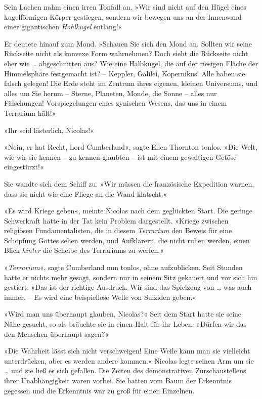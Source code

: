 Sein Lachen nahm einen irren Tonfall an. »Wir sind nicht auf den
Hügel eines kugelförmigen Körper gestiegen, sondern wir bewegen uns
an der Innenwand einer gigantischen \emph{Hohlkugel} entlang!«

Er deutete hinauf zum Mond. »Schauen Sie sich den Mond an. Sollten
wir seine Rückseite nicht als konvexe Form wahrnehmen? Doch sieht
die Rückseite nicht eher wie … abgeschnitten aus? Wie eine
Halbkugel, die auf der riesigen Fläche der Himmelsphäre festgemacht
ist? – Keppler, Galilei, Kopernikus! Alle haben sie falsch gelegen!
Die Erde steht im Zentrum ihres eigenen, kleinen Universums, und
alles um Sie herum – Sterne, Planeten, Monde, die Sonne – alles nur
Fälschungen! Vorspiegelungen eines zynischen Wesens, das uns in
einem Terrarium hält!«

»Ihr seid lästerlich, Nicolas!«

»Nein, er hat Recht, Lord Cumberland«, sagte Ellen Thornton tonlos.
»Die Welt, wie wir sie kennen – zu kennen glaubten – ist mit einem
gewaltigen Getöse eingestürzt!«

Sie wandte sich dem Schiff zu. »Wir müssen die französische
Expedition warnen, dass sie nicht wie eine Fliege an die Wand
klatscht.«

\tb

»Es wird Kriege geben«, meinte Nicolas nach dem geglückten Start.
Die geringe Schwerkraft hatte in der Tat kein Problem dargestellt.
»Kriege zwischen religiösen Fundamentalisten, die in diesem
\emph{Terrarium} den Beweis für eine Schöpfung Gottes sehen werden,
und Aufklärern, die nicht ruhen werden, einen Blick \emph{hinter}
die Scheibe des Terrariums zu werfen.«

\bigpar

»\emph{Terrarium}«, sagte Cumberland nun tonlos, ohne aufzublicken.
Seit Stunden hatte er nichts mehr gesagt, sondern nur in seinem
Sitz gekauert und vor sich hin gestiert. »Das ist der richtige
Ausdruck. Wir sind das Spielzeug von … was auch immer. – Es wird
eine beispiellose Welle von Suiziden geben.«

\bigpar

»Wird man uns überhaupt glauben, Nicolas?« Seit dem Start hatte sie
seine Nähe gesucht, so als bräuchte sie in einen Halt für ihr
Leben. »Dürfen wir das den Menschen überhaupt sagen?«

»Die Wahrheit lässt sich nicht verschweigen! Eine Weile kann man
sie vielleicht unterdrücken, aber es werden andere kommen.« Nicolas
legte seinen Arm um sie … und sie ließ es sich gefallen. Die Zeiten
des demonstrativen Zurschaustellens ihrer Unabhängigkeit waren
vorbei. Sie hatten vom Baum der Erkenntnis gegessen und die
Erkenntnis war zu groß für einen Einzelnen.


